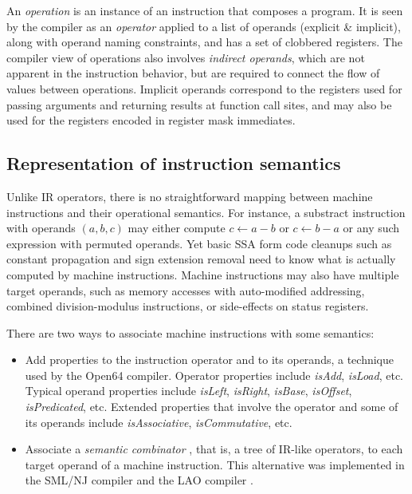 An \emph{operation} is an instance of an instruction that composes a program. It
is seen by the compiler as an \emph{operator} applied to a list of operands
(explicit \& implicit), along with operand naming constraints, and has a set of
clobbered registers. The compiler view of operations also involves
\emph{indirect operands}, which are not apparent in the instruction behavior,
but are required to connect the flow of values between operations.  Implicit
operands correspond to the registers used for passing arguments and returning
results at function call sites, and may also be used for the registers
encoded in register mask immediates.


\subsection{Representation of instruction semantics}

Unlike IR operators, there is no straightforward mapping between machine
instructions and their operational semantics. For instance, a substract instruction with
operands $(a,b,c)$ may either compute $c \leftarrow a-b$ or $c \leftarrow b-a$
or any such expression with permuted operands. Yet basic SSA form code cleanups
such as constant propagation and sign extension removal need to know what is
actually computed by machine instructions. Machine instructions may also have
multiple target operands, such as memory accesses with auto-modified addressing,
combined division-modulus instructions, or side-effects on status registers.

There are two ways to associate machine instructions with some
semantics: \begin{itemize}

\item Add properties to the instruction operator and to
its operands, a technique used by the Open64 compiler. Operator properties
include \emph{isAdd}, \emph{isLoad}, etc. Typical operand properties include
\emph{isLeft}, \emph{isRight}, \emph{isBase}, \emph{isOffset},
\emph{isPredicated}, etc. Extended properties that involve the operator and some
of its operands include \emph{isAssociative}, \emph{isCommutative}, etc.  \item
Associate a \emph{semantic combinator} \cite{Wand:1983:IC}, that is, a tree of IR-like operators, to
each target operand of a machine instruction. This alternative
was implemented in the SML/NJ \cite{Leung:1999:PLDI} compiler and the LAO
compiler \cite{Dinechin:2000:CASES}.  \end{itemize}

